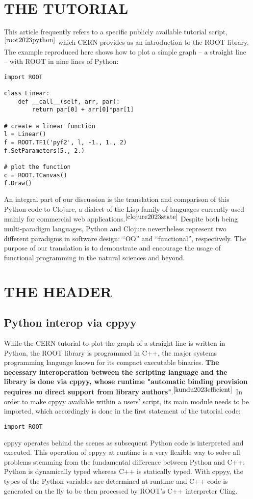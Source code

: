 \documentclass[twocolumn]{article}
\begin{document}
\section{THE TUTORIAL}
This article frequently refers to a specific publicly available tutorial script,$^{\cite{root2023python}}$ which CERN provides as an introduction to the ROOT library. The example reproduced here shows how to plot a simple graph – a straight line – with ROOT in nine lines of Python:
{\color{magenta}\begin{verbatim}
import ROOT

class Linear:
    def __call__(self, arr, par):
        return par[0] + arr[0]*par[1]

# create a linear function
l = Linear()
f = ROOT.TF1('pyf2', l, -1., 1., 2)
f.SetParameters(5., 2.)

# plot the function
c = ROOT.TCanvas()
f.Draw()
\end{verbatim}}
An integral part of our discussion is the translation and comparison of this Python code to Clojure, a dialect of the Lisp family of languages currently used mainly for commercial web applications.$^{\cite{clojure2023state}}$ Despite both being multi-paradigm languages, Python and Clojure nevertheless represent two different paradigms in software design: “OO” and “functional”, respectively. The purpose of our translation is to demonstrate and encourage the usage of functional programming in the natural sciences and beyond.

\section{THE HEADER}
\subsection{Python interop via cppyy}
While the CERN tutorial to plot the graph of a straight line is written in Python, the ROOT library is programmed in C++, the major systems programming language known for its compact executable binaries. \textbf{The necessary interoperation between the scripting language and the library is done via cppyy, whose runtime "automatic binding provision requires no direct support from library authors"}.$^{\cite{kundu2023efficient}}$ In order to make cppyy available within a users’ script, its main module needs to be imported, which accordingly is done in the first statement of the tutorial code:
{\color{magenta}\begin{verbatim}
import ROOT
\end{verbatim}}
cppyy operates behind the scenes as subsequent Python code is interpreted and executed. This operation of cppyy at runtime is a very flexible way to solve all problems stemming from the fundamental difference between Python and C++: Python is dynamically typed whereas C++ is statically typed. With cppyy, the types of the Python variables are determined at runtime and C++ code is generated on the fly to be then processed by ROOT’s C++ interpreter Cling.
\end{document}

